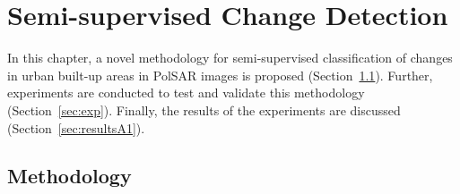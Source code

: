 \chapter{Semi-supervised Change Detection}

In this chapter, a novel methodology for semi-supervised classification of changes in urban built-up areas in PolSAR images is proposed (Section~\ref{sec:sfo_ba145}). Further, experiments are conducted to test and validate this methodology (Section~\ref{sec:exp}). Finally, the results of the experiments are discussed (Section~\ref{sec:resultsA1}). 

\section{Methodology} 
\label{sec:sfo_ba145}


